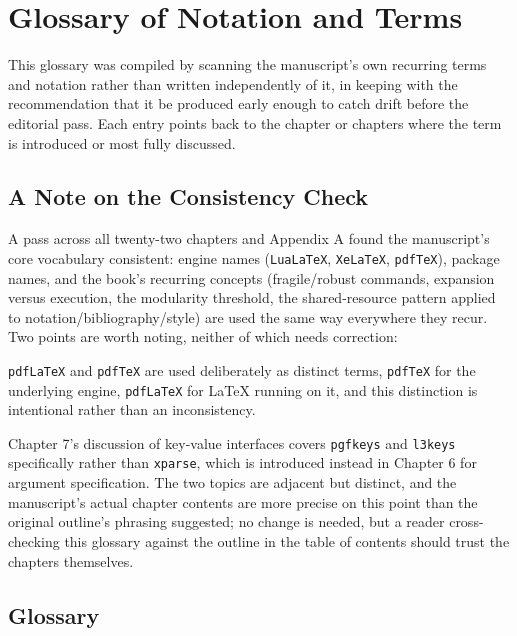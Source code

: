 \hypertarget{appendix-d-glossary-of-notation-and-terms}{%
\chapter{Glossary of Notation and Terms}\label{appendix-d-glossary-of-notation-and-terms}}

This glossary was compiled by scanning the manuscript's own recurring terms and notation rather than written independently of it, in keeping with the recommendation that it be produced early enough to catch drift before the editorial pass. Each entry points back to the chapter or chapters where the term is introduced or most fully discussed.

\hypertarget{a-note-on-the-consistency-check}{%
\section{A Note on the Consistency Check}\label{a-note-on-the-consistency-check}}

A pass across all twenty-two chapters and Appendix A found the manuscript's core vocabulary consistent: engine names (\texttt{LuaLaTeX}, \texttt{XeLaTeX}, \texttt{pdfTeX}), package names, and the book's recurring concepts (fragile/robust commands, expansion versus execution, the modularity threshold, the shared-resource pattern applied to notation/bibliography/style) are used the same way everywhere they recur. Two points are worth noting, neither of which needs correction:

\texttt{pdfLaTeX} and \texttt{pdfTeX} are used deliberately as distinct terms, \texttt{pdfTeX} for the underlying engine, \texttt{pdfLaTeX} for LaTeX running on it, and this distinction is intentional rather than an inconsistency.

Chapter 7's discussion of key-value interfaces covers \texttt{pgfkeys} and \texttt{l3keys} specifically rather than \texttt{xparse}, which is introduced instead in Chapter 6 for argument specification. The two topics are adjacent but distinct, and the manuscript's actual chapter contents are more precise on this point than the original outline's phrasing suggested; no change is needed, but a reader cross-checking this glossary against the outline in the table of contents should trust the chapters themselves.

\hypertarget{glossary}{%
\section{Glossary}\label{glossary}}

